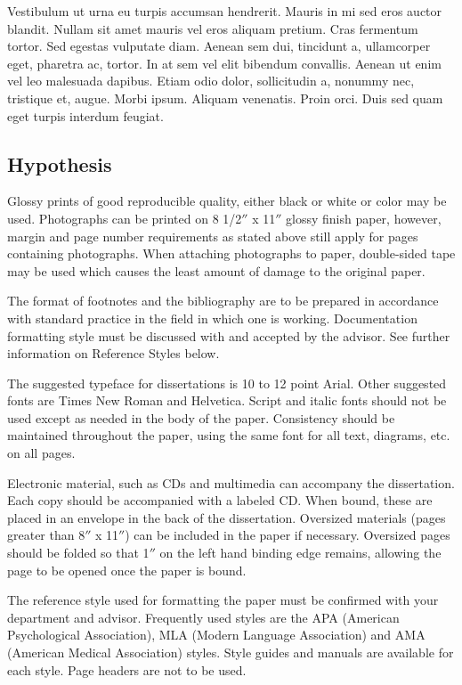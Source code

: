 Vestibulum ut urna eu turpis accumsan hendrerit. Mauris in mi sed eros auctor blandit. Nullam sit amet mauris vel eros aliquam pretium. Cras fermentum tortor. Sed egestas vulputate diam. Aenean sem dui, tincidunt a, ullamcorper eget, pharetra ac, tortor. In at sem vel elit bibendum convallis. Aenean ut enim vel leo malesuada dapibus. Etiam odio dolor, sollicitudin a, nonummy nec, tristique et, augue. Morbi ipsum. Aliquam venenatis. Proin orci. Duis sed quam eget turpis interdum feugiat.

\subsection{Hypothesis}  


Glossy prints of good reproducible quality, either black or white or color may be used. Photographs can be printed on 8 1/2$''$ x 11$''$ glossy finish paper, however, margin and page number requirements as stated above still apply for pages containing photographs. When attaching photographs to paper, double-sided tape may be used which causes the least amount of damage to the original paper.

The format of footnotes and the bibliography are to be prepared in accordance with standard practice in the field in which one is working. Documentation formatting style must be discussed with and accepted by the advisor. See further information on Reference Styles below.

The suggested typeface for dissertations is 10 to 12 point Arial. Other suggested fonts are Times New Roman and Helvetica. Script and italic fonts should not be used except as needed in the body of the paper. Consistency should be maintained throughout the paper, using the same font for all text, diagrams, etc. on all pages.

Electronic material, such as CDs and multimedia can accompany the dissertation. Each copy should be accompanied with a labeled CD. When bound, these are placed in an envelope in the back of the dissertation.  Oversized materials (pages greater than 8$''$ x 11$''$) can be included in the paper if necessary. Oversized pages should be folded so that 1$''$ on the left hand binding edge remains, allowing the page to be opened once the paper is bound.

The reference style used for formatting the paper must be confirmed with your department and advisor. Frequently used styles are the APA (American Psychological Association), MLA (Modern Language Association) and AMA (American Medical Association) styles. Style guides and manuals are available for each style. Page headers are not to be used.
